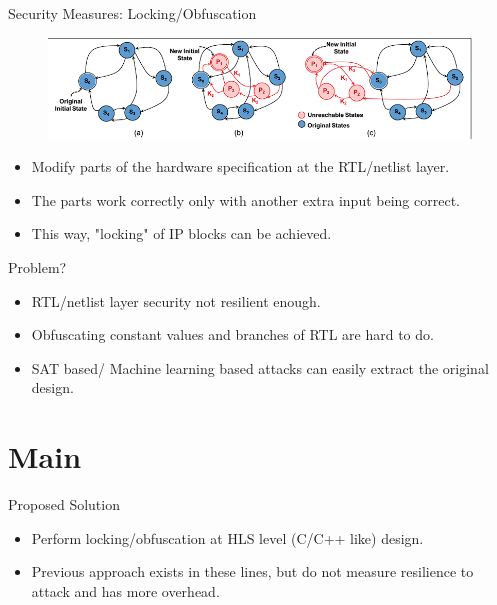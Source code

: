 \documentclass[xcolor=dvipsnames]{beamer}
\begin{document}
    \begin{frame}{Security Measures: Locking/Obfuscation}

                
        \begin{figure}
            \includegraphics[scale=0.6]{State_Lock.PNG}
        \end{figure}

        
        \begin{itemize}
            \item Modify parts of the hardware specification at the RTL/netlist layer.
            \item The parts work correctly only with another extra input being correct.
            \item This way, "locking" of IP blocks can be achieved.
        \end{itemize}

    \end{frame}

    \begin{frame}{Problem?}

        \begin{itemize}
            \item RTL/netlist layer security not resilient enough.
            \item Obfuscating constant values and branches of RTL are hard to do. 
            \item SAT based/ Machine learning based attacks can easily extract the original design.
        \end{itemize}
        
    \end{frame}

    \section{Main}
    \begin{frame}{Proposed Solution}

        \begin{itemize}
            \item Perform locking/obfuscation at HLS level (C/C++ like) design.
            \item Previous approach exists in these lines, but do not measure resilience to attack and has more overhead.
        \end{itemize}
        
    \end{frame}
\end{document}
